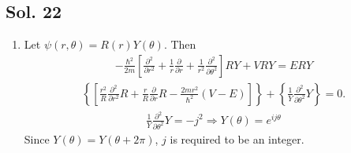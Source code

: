 \subsection*{Sol. 22}
\begin{enumerate}
    \item Let $\psi(r,\theta) = R(r)Y(\theta)$.
          Then
          \begin{align*}
              -\frac{\hbar^2}{2m}
              \left[
                  \frac{\partial^2}{\partial r^2}
                  + \frac{1}{r}\frac{\partial}{\partial r}
                  + \frac{1}{r^2}\frac{\partial^2}{\partial\theta^2}
                  \right]RY
              +VRY
              =ERY
          \end{align*}
          \begin{align*}
              \left\{
              \left[
                  \frac{r^2}{R}\frac{\partial^2}{\partial r^2}R
                  + \frac{r}{R}\frac{\partial}{\partial r}R
                  -\frac{2mr^2}{\hbar^2}(V-E)
                  \right]\right\}
              +\left\{
              \frac{1}{Y}\frac{\partial^2}{\partial\theta^2}Y
              \right\}
              =0.
          \end{align*}
          \begin{align*}
              \frac{1}{Y}\frac{\partial^2}{\partial\theta^2}Y = -j^2
              \Rightarrow
              Y(\theta) = e^{ij\theta}
          \end{align*}
          Since  $Y(\theta) = Y(\theta+2\pi)$, $j$ is required to be an integer.


\end{enumerate}
